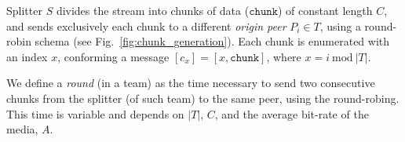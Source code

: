 \label{sec:chunk_generation}
\begin{figure*}
  \caption{Chunk generation at the splitter.\label{fig:chunk_generation}}
\end{figure*}
Splitter $S$ divides the stream into chunks of data ($\mathtt{chunk}$)
of constant length $C$, and sends exclusively each chunk to a
different \emph{origin peer} $P_i\in T$, using a round-robin schema
(see Fig.~\ref{fig:chunk_generation}). Each chunk is enumerated with
an index $x$, conforming a message $[c_x]=[x,\mathtt{chunk}]$, where
$x=i~\mathrm{mod}~|T|$.

We define a \emph{round} (in a team) as the time necessary to send two
consecutive chunks from the splitter (of such team) to the same peer,
using the round-robing. This time is variable and depends on $|T|$,
$C$, and the average bit-rate of the media, $A$.

\begin{comment}
The round-time is defined by:
\begin{equation}
  \cal{r} = \cal{c}N.
  \label{eq:round_time}
\end{equation}
For example, if we use only one team of $N=256$ peers, a chunk size
$C=1024$~bytes, and a video of $1$~Mb/s, the round time is
\begin{displaymath}
  \cal{r} = \frac{1024\frac{\text{bytes}}{\text{chunk}}\times
    8\frac{\text{bits}}{\text{byte}}}{10^6\frac{\text{bits}}{\text{second}}}\times
  256 \approx 2.1~\text{seconds}.
\end{displaymath}
\end{comment}
